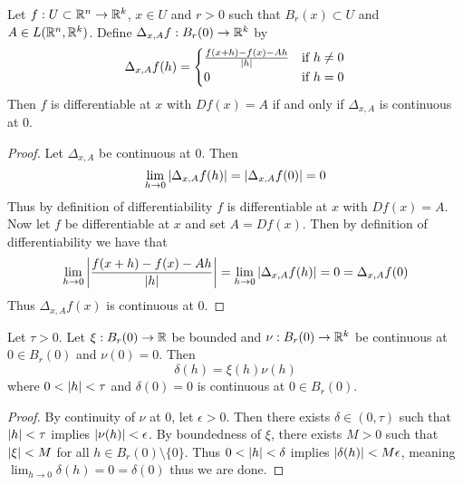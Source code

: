 \documentclass[a4paper]{article}
\begin{document}
\begin{lmm}{}{} Let $f:U\subset\mathbb{R}^n\to\mathbb{R}^k$, $x\in U$ and $r>0$ such that $B_r(x)\subset U$ and $A\in L(\mathbb{R}^n,\mathbb{R}^k)$. Define $\Delta_{x,A}f:B_r(0)\to\mathbb{R}^k$ by $$\Delta_{x,A}f(h)=\begin{cases}
\frac{f(x+h)-f(x)-Ah}{\abs{h}} & \text{if $h\neq0$}\\
0 & \text{if $h=0$}
\end{cases}$$
Then $f$ is differentiable at $x$ with $Df(x)=A$ if and only if $\Delta_{x,A}$ is continuous at $0$. 
\begin{proof}
Let $\Delta_{x,A}$ be continuous at $0$. Then $$\lim_{h\to 0}\abs{\Delta_{x,A}f(h)}=\abs{\Delta_{x,A}f(0)}=0$$ Thus by definition of differentiability $f$ is differentiable at $x$ with $Df(x)=A$. \\
Now let $f$ be differentiable at $x$ and set $A=Df(x)$. Then by definition of differentiability we have that $$\lim_{h\to 0}\abs{\frac{f(x+h)-f(x)-Ah}{\abs{h}}}=\lim_{h\to 0}\abs{\Delta_{x,A}f(h)}=0=\Delta_{x,A}f(0)$$ Thus $\Delta_{x,A}f(x)$ is continuous at $0$. 
\end{proof}
\end{lmm}

\begin{lmm}{}{} Let $\tau>0$. Let $\xi:B_r(0)\to\mathbb{R}$ be bounded and $\nu:B_r(0)\to\mathbb{R}^k$ be continuous at $0\in B_r(0)$ and $\nu(0)=0$. Then $$\delta(h)=\xi(h)\nu(h)$$ where $0<\abs{h}<\tau$ and $\delta(0)=0$ is continuous at $0\in B_r(0)$. 
\begin{proof}
By continuity of $\nu$ at $0$, let $\epsilon>0$. Then there exists $\delta\in(0,\tau)$ such that $\abs{h}<\tau$ implies $\abs{\nu(h)}<\epsilon$. By boundedness of $\xi$, there exists $M>0$ such that $\abs{\xi}<M$ for all $h\in B_r(0)\setminus\{0\}$. Thus $0<\abs{h}<\delta$ implies $\abs{\delta(h)}<M\epsilon$, meaning $\lim_{h\to 0}\delta(h)=0=\delta(0)$ thus we are done. 
\end{proof}
\end{lmm}
\end{document}
